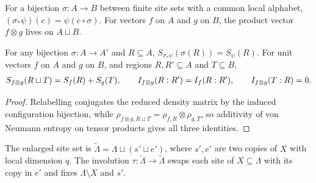 \begin{definition}
    \label{def:al_amp_site_relabel}
    \leanok
    For a bijection $\sigma:A\to B$ between finite site sets with a common local
    alphabet, $(\sigma_*\psi)(c)=\psi(c\circ\sigma)$. For vectors $f$ on $A$
    and $g$ on $B$, the product vector $f\otimes g$ lives on $A\sqcup B$.
\end{definition}

\begin{lemma}
    \label{thm:al_amp_site_entropy}
    \leanok
    For any bijection $\sigma:A\to A'$ and $R\subseteq A$,
    $S_{\sigma_*\psi}(\sigma(R))=S_\psi(R)$. For unit vectors $f$ on $A$ and
    $g$ on $B$, and regions $R,R'\subseteq A$ and $T\subseteq B$,
    \begin{align}
        S_{f\otimes g}(R\sqcup T)=S_f(R)+S_g(T),\qquad
        I_{f\otimes g}(R:R')=I_f(R:R'),\qquad
        I_{f\otimes g}(T:R)=0. \notag
    \end{align}
\end{lemma}
\begin{proof}
    \leanok
    Relabelling conjugates the reduced density matrix by the induced
    configuration bijection, while $\rho_{f\otimes g,R\sqcup T}=\rho_{f,R}\otimes\rho_{g,T}$,
    so additivity of von Neumann entropy on tensor products gives all three
    identities.
\end{proof}

\begin{definition}
    \label{def:al_amp_ancilla_sites}
    \leanok
    The enlarged site set is $\widetilde\Lambda=\Lambda\sqcup(s'\sqcup e')$,
    where $s',e'$ are two copies of $X$ with local dimension $q$. The involution
    $\tau:\widetilde\Lambda\to\widetilde\Lambda$ swaps each site of $X\subseteq\Lambda$
    with its copy in $e'$ and fixes $\Lambda\setminus X$ and $s'$.
\end{definition}

